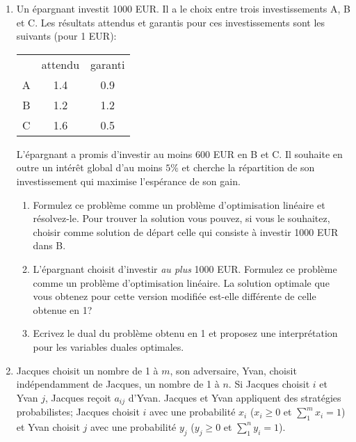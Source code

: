 \begin{enumerate}
    \begin{solution}
      \nosolution
    \end{solution}

  \item  Un épargnant investit 1000 EUR. Il a le choix entre trois investissements A, B et C. Les résultats attendus et
    garantis pour ces investissements sont les suivants (pour 1 EUR):\\


    \begin{tabular}{ccc}
      & attendu & garanti\\
      A & 1.4 & 0.9\\
      B & 1.2 & 1.2\\
      C & 1.6 & 0.5\\
    \end{tabular}

    \hspace{10mm}

    L'épargnant a promis d'investir au moins 600 EUR en  B et C. Il souhaite en outre un intérêt global
    d'au moins
    $5 \%$ et cherche la répartition de son investissement  qui maximise l'espérance de son gain.

    \begin{enumerate}
      \item Formulez ce problème comme un problème d'optimisation linéaire et résolvez-le. Pour trouver la
        solution vous pouvez, si vous le souhaitez, choisir comme solution de départ celle qui consiste à investir 1000
        EUR dans B.
      \item L'épargnant choisit d'investir \emph{au plus}   1000 EUR. Formulez ce problème comme un problème
        d'optimisation linéaire. La solution optimale que vous obtenez pour cette version modifiée est-elle
        différente de celle obtenue en 1?
      \item Ecrivez le dual du problème obtenu en 1 et proposez une interprétation pour les variables duales
        optimales.
    \end{enumerate}


    \begin{solution}
      \nosolution
    \end{solution}

  \item Jacques choisit un nombre de 1 \`a $m$, son adversaire, Yvan,
    choisit ind\'ependamment de Jacques, un nombre de 1 \`a $n$. Si
    Jacques choisit $i$ et Yvan $j$, Jacques re\c coit $a_{ij}$ d'Yvan.
    Jacques et Yvan appliquent des strat\'egies probabilistes; Jacques
    choisit $i$ avec une probabilit\'e $x_i$  ($x_i \geq 0$ et $\sum_1^m
    x_i =1$) et Yvan choisit $j$ avec une probabilit\'e $y_j$ ($y_j \geq
    0$ et $\sum_1^n y_i =1$).


\end{enumerate}
